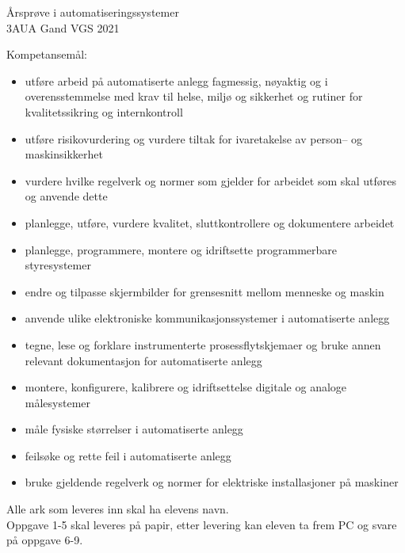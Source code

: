 
\Huge Årsprøve i automatiseringssystemer\\ 3AUA Gand VGS 2021

\normalsize

\vskip 10pt 
Kompetansemål:
\begin{itemize}[noitemsep]
\item utføre arbeid på automatiserte anlegg fagmessig, nøyaktig og i overensstemmelse med krav til helse, miljø og sikkerhet og rutiner for kvalitetssikring og internkontroll
\item utføre risikovurdering og vurdere tiltak for ivaretakelse av person– og maskinsikkerhet
\item vurdere hvilke regelverk og normer som gjelder for arbeidet som skal utføres og anvende dette
\item planlegge, utføre, vurdere kvalitet, sluttkontrollere og dokumentere arbeidet
\item planlegge, programmere, montere og idriftsette programmerbare styresystemer
\item endre og tilpasse skjermbilder for grensesnitt mellom menneske og maskin
\item anvende ulike elektroniske kommunikasjonssystemer i automatiserte anlegg
\item tegne, lese og forklare instrumenterte prosessflytskjemaer og bruke annen relevant dokumentasjon for automatiserte anlegg
\item montere, konfigurere, kalibrere og idriftsettelse digitale og analoge målesystemer
\item måle fysiske størrelser i automatiserte anlegg
\item feilsøke og rette feil i automatiserte anlegg
\item bruke gjeldende regelverk og normer for elektriske installasjoner på maskiner
\end{itemize}

Alle ark som leveres inn skal ha elevens navn. \\ 

Oppgave 1-5 skal leveres på papir, etter levering kan eleven ta frem PC og svare på oppgave 6-9.\\

\vskip 2.5pt 

